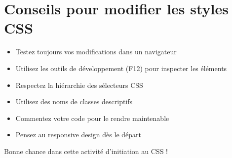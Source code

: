 \documentclass[12pt,a4paper]{article}
\begin{document}
\section{Conseils pour modifier les styles CSS}

\begin{itemize}
\item Testez toujours vos modifications dans un navigateur
\item Utilisez les outils de développement (F12) pour inspecter les éléments
\item Respectez la hiérarchie des sélecteurs CSS
\item Utilisez des noms de classes descriptifs
\item Commentez votre code pour le rendre maintenable
\item Pensez au responsive design dès le départ
\end{itemize}

Bonne chance dans cette activité d'initiation au CSS !
\end{document}
